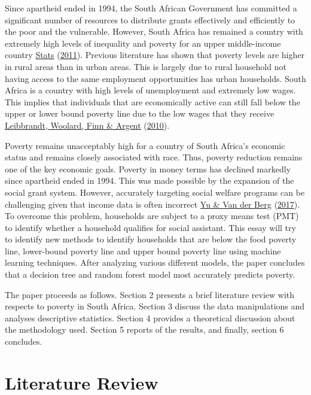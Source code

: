 \documentclass[11pt,preprint, authoryear]{elsarticle}
\numberwithin{equation}{section}
\numberwithin{figure}{section}
\numberwithin{table}{section}
\begin{document}
Since apartheid ended in 1994, the South African Government has
committed a significant number of resources to distribute grants
effectively and efficiently to the poor and the vulnerable. However,
South Africa has remained a country with extremely high levels of
inequality and poverty for an upper middle-income country
\protect\hyperlink{ref-stats2011social}{Stats}
(\protect\hyperlink{ref-stats2011social}{2011}). Previous literature has
shown that poverty levels are higher in rural areas than in urban areas.
This is largely due to rural household not having access to the same
employment opportunities has urban households. South Africa is a country
with high levels of unemployment and extremely low wages. This implies
that individuals that are economically active can still fall below the
upper or lower bound poverty line due to the low wages that they receive
\protect\hyperlink{ref-leibbrandt2010trends}{Leibbrandt, Woolard, Finn
\& Argent} (\protect\hyperlink{ref-leibbrandt2010trends}{2010}).

Poverty remains unacceptably high for a country of South Africa's
economic status and remains closely associated with race. Thus, poverty
reduction remains one of the key economic goals. Poverty in money terms
has declined markedly since apartheid ended in 1994. This was made
possible by the expansion of the social grant system. However,
accurately targeting social welfare programs can be challenging given
that income data is often incorrect
\protect\hyperlink{ref-vanderberg2017}{Yu \& Van der Berg}
(\protect\hyperlink{ref-vanderberg2017}{2017}). To overcome this
problem, households are subject to a proxy means test (PMT) to identify
whether a household qualifies for social assistant. This essay will try
to identify new methods to identify households that are below the food
poverty line, lower-bound poverty line and upper bound poverty line
using machine learning techniques. After analyzing various different
models, the paper concludes that a decision tree and random forest model
most accurately predicts poverty.

The paper proceeds as follows. Section 2 presents a brief literature
review with respects to poverty in South Africa. Section 3 discuss the
data manipulations and analyses descriptive statistics. Section 4
provides a theoretical discussion about the methodology used. Section 5
reports of the results, and finally, section 6 concludes.

\hypertarget{literature-review}{%
\section{Literature Review}\label{literature-review}}
\end{document}
